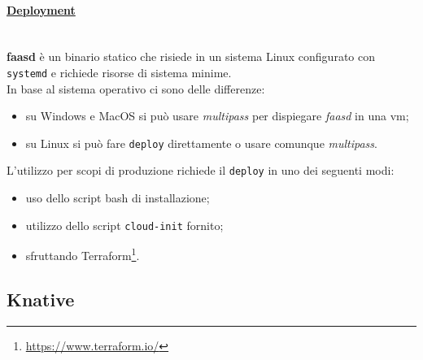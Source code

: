 \documentclass[12pt,a4paper,openany,twoside]{book}
\begin{document}
\paragraph{\underline{Deployment}} ~\\
\textbf{faasd} è un binario statico che risiede in un sistema Linux configurato con \texttt{systemd} e richiede risorse di sistema minime.
\\
In base al sistema operativo ci sono delle differenze:
\begin{itemize}
    \item su Windows e MacOS si può usare \textit{multipass} per dispiegare \textit{faasd} in una \ac{vm};
    
    \item su Linux si può fare \texttt{deploy} direttamente o usare comunque \textit{multipass}.
\end{itemize}

\noindent
L'utilizzo per scopi di produzione richiede il \texttt{deploy} in uno dei seguenti modi:
\begin{itemize}
    \item uso dello script bash di installazione;
    
    \item utilizzo dello script \texttt{cloud-init} fornito;
    
    \item sfruttando Terraform\footnote{\url{https://www.terraform.io/}}.
\end{itemize}


\subsection{Knative}
\end{document}
